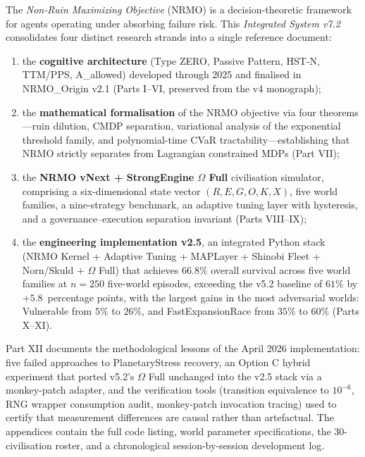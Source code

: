 
\noindent
The \emph{Non-Ruin Maximizing Objective} (NRMO) is a decision-theoretic
framework for agents operating under absorbing failure risk. This
\emph{Integrated System v7.2} consolidates four distinct
research strands into a single reference document:

\begin{enumerate}[leftmargin=2em,topsep=0.3em,itemsep=0.2em]
  \item the \textbf{cognitive architecture} (Type ZERO, Passive Pattern,
    HST-N, TTM/PPS, A\_allowed) developed through 2025 and finalised in
    NRMO\_Origin v2.1 (Parts I--VI, preserved from the v4 monograph);
  \item the \textbf{mathematical formalisation} of the NRMO objective via
    four theorems---ruin dilution, CMDP separation, variational analysis
    of the exponential threshold family, and polynomial-time CVaR
    tractability---establishing that NRMO strictly separates from
    Lagrangian constrained MDPs (Part VII);
  \item the \textbf{NRMO vNext + StrongEngine $\Omega$ Full} civilisation
    simulator, comprising a six-dimensional state vector
    $(R, E, G, O, K, X)$, five world families, a nine-strategy
    benchmark, an adaptive tuning layer with hysteresis, and a
    governance--execution separation invariant (Parts VIII--IX);
  \item the \textbf{engineering implementation v2.5}, an integrated
    Python stack (NRMO Kernel + Adaptive Tuning + MAPLayer + Shinobi
    Fleet + Norn/Skuld + $\Omega$ Full) that achieves
    $66.8\%$ overall survival across five world families at $n = 250$
    five-world episodes, exceeding the v5.2 baseline of
    $61\%$ by $+5.8$~percentage points, with the largest gains in the
    most adversarial worlds: Vulnerable from $5\%$ to $26\%$, and
    FastExpansionRace from $35\%$ to $60\%$ (Parts X--XI).
\end{enumerate}

\noindent
Part XII documents the methodological lessons of the April 2026
implementation: five failed approaches to PlanetaryStress recovery, an
Option C hybrid experiment that ported v5.2's $\Omega$ Full unchanged
into the v2.5 stack via a monkey-patch adapter, and the verification
tools (transition equivalence to $10^{-6}$, RNG wrapper consumption
audit, monkey-patch invocation tracing) used to certify that
measurement differences are causal rather than artefactual. The
appendices contain the full code listing, world parameter
specifications, the 30-civilisation roster, and a chronological
session-by-session development log.

